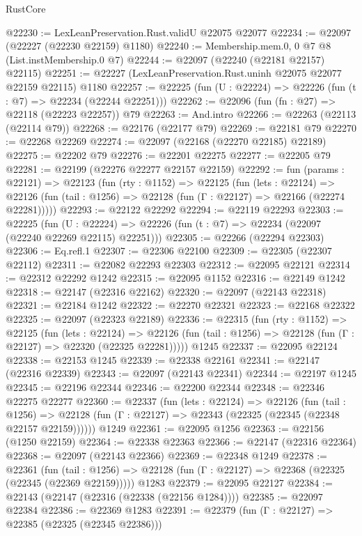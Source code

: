 \begin{lexlean}{RustCore}
\begin{coremodule}
@22230 := LexLeanPreservation.Rust.validU @22075 @22077
@22234 := @22097 (@22227 (@22230 @22159) @1180)
@22240 := Membership.mem.{0, 0} @7 @8 (List.instMembership.{0} @7)
@22244 := @22097 (@22240 (@22181 @22157) @22115)
@22251 := @22227 (LexLeanPreservation.Rust.uninh @22075 @22077 @22159 @22115) @1180
@22257 := @22225 (fun (U : @22224) => @22226 (fun (t : @7) => @22234 (@22244 @22251)))
@22262 := @22096 (fun (fn : @27) => @22118 (@22223 @22257)) @79
@22263 := And.intro
@22266 := @22263 (@22113 (@22114 @79))
@22268 := @22176 (@22177 @79)
@22269 := @22181 @79
@22270 := @22268 @22269
@22274 := @22097 (@22168 (@22270 @22185) @22189)
@22275 := @22202 @79
@22276 := @22201 @22275
@22277 := @22205 @79
@22281 := @22199 (@22276 @22277 @22157 @22159)
@22292 := fun (params : @22121) =>
  @22123
    (fun (rty : @1152) =>
    @22125
      (fun (lets : @22124) =>
      @22126 (fun (tail : @1256) => @22128 (fun (Γ : @22127) => @22166 (@22274 @22281)))))
@22293 := @22122 @22292
@22294 := @22119 @22293
@22303 := @22225
    (fun (U : @22224) => @22226 (fun (t : @7) => @22234 (@22097 (@22240 @22269 @22115) @22251)))
@22305 := @22266 (@22294 @22303)
@22306 := Eq.refl.{1}
@22307 := @22306 @22100
@22309 := @22305 (@22307 @22112)
@22311 := @22082 @22293 @22303
@22312 := @22095 @22121
@22314 := @22312 @22292 @1242
@22315 := @22095 @1152
@22316 := @22149 @1242
@22318 := @22147 (@22316 @22162)
@22320 := @22097 (@22143 @22318)
@22321 := @22184 @1242
@22322 := @22270 @22321
@22323 := @22168 @22322
@22325 := @22097 (@22323 @22189)
@22336 := @22315
    (fun (rty : @1152) =>
    @22125
      (fun (lets : @22124) =>
      @22126 (fun (tail : @1256) => @22128 (fun (Γ : @22127) => @22320 (@22325 @22281)))))
    @1245
@22337 := @22095 @22124
@22338 := @22153 @1245
@22339 := @22338 @22161
@22341 := @22147 (@22316 @22339)
@22343 := @22097 (@22143 @22341)
@22344 := @22197 @1245
@22345 := @22196 @22344
@22346 := @22200 @22344
@22348 := @22346 @22275 @22277
@22360 := @22337
    (fun (lets : @22124) =>
    @22126
      (fun (tail : @1256) =>
      @22128 (fun (Γ : @22127) => @22343 (@22325 (@22345 (@22348 @22157 @22159))))))
    @1249
@22361 := @22095 @1256
@22363 := @22156 (@1250 @22159)
@22364 := @22338 @22363
@22366 := @22147 (@22316 @22364)
@22368 := @22097 (@22143 @22366)
@22369 := @22348 @1249
@22378 := @22361
    (fun (tail : @1256) => @22128 (fun (Γ : @22127) => @22368 (@22325 (@22345 (@22369 @22159)))))
    @1283
@22379 := @22095 @22127
@22384 := @22143 (@22147 (@22316 (@22338 (@22156 @1284))))
@22385 := @22097 @22384
@22386 := @22369 @1283
@22391 := @22379 (fun (Γ : @22127) => @22385 (@22325 (@22345 @22386)))

\end{coremodule}
\end{lexlean}
